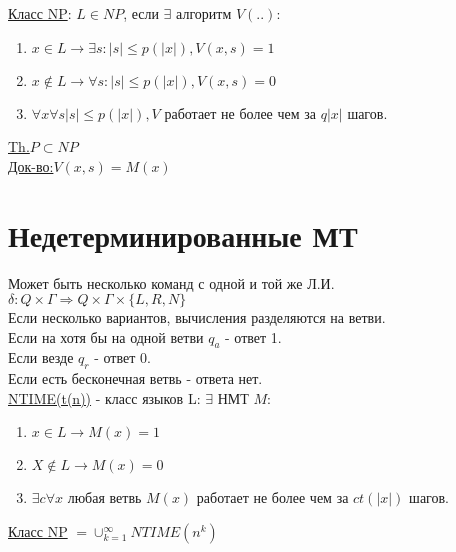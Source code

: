 	
	\underline{Класс NP}: $L\in NP$, если $\exists$ алгоритм $V(..):$
	\begin{enumerate}
		\item $x\in L \to \exists s:|s| \le p(|x|), V(x,s)=1$
		\item $x\not\in L \to \forall s:|s| \le p(|x|), V(x,s)=0$
		\item $\forall x \forall s |s| \le p(|x|), V$ работает не более чем за $q{|x|}$ шагов.
	\end{enumerate}
	\underline{Th.}$P \subset NP$\\
	\underline{Док-во:}$V(x,s)=M(x)$\\
	
	
	\section{Недетерминированные МТ}
	Может быть несколько команд с одной и той же Л.И.$\delta:Q\times\Gamma \Rightarrow Q\times\Gamma\times\{L,R,N\}$\\
	Если несколько вариантов, вычисления разделяются на ветви.\\
	Если на хотя бы на одной ветви $q_a$ - ответ 1.\\
	Если везде $q_r$ - ответ 0.\\
	Если есть бесконечная ветвь - ответа нет.\\
	
	\underline{NTIME(t(n))} - класс языков L: $\exists$ НМТ $M$:
	 \begin{enumerate}
	 	\item $x \in L \to M(x)=1$
		\item $X \not\in L \to M(x)=0$
		\item $\exists c \forall x$ любая ветвь $M(x)$ работает не более чем за $ct(|x|)$ шагов.
	 \end{enumerate}
	
	\underline{Класс NP} $ = \cup_{k=1}^{\infty}NTIME(n^k)$